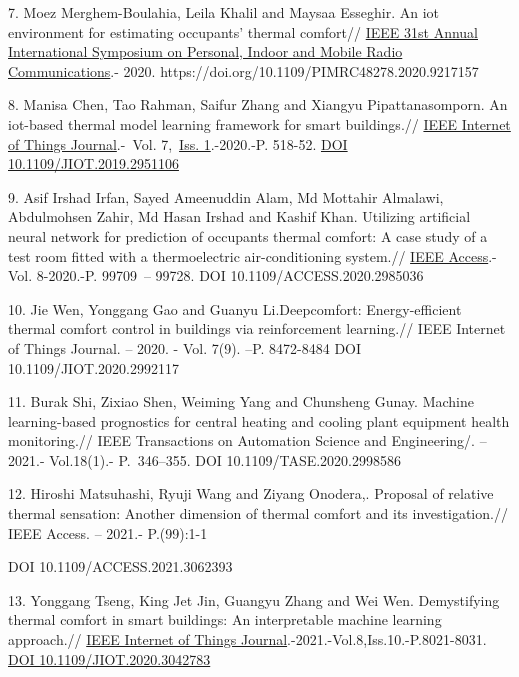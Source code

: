 \begin{references}
7. Moez Merghem-Boulahia, Leila Khalil and Maysaa Esseghir. An iot
environment for estimating occupants' thermal comfort//
\href{https://ieeexplore.ieee.org/xpl/conhome/9210501/proceeding}{IEEE
31st Annual International Symposium on Personal, Indoor and Mobile Radio
Communications}.- 2020. https://doi.org/10.1109/PIMRC48278.2020.9217157

8. Manisa Chen, Tao Rahman, Saifur Zhang and Xiangyu Pipattanasomporn.
An iot-based thermal model learning framework for smart buildings.//
\href{https://ieeexplore.ieee.org/xpl/RecentIssue.jsp?punumber=6488907}{IEEE
Internet of Things Journal}.-~Vol.
7,~\href{https://ieeexplore.ieee.org/xpl/tocresult.jsp?isnumber=8955685&punumber=6488907}{Iss.
1}.-2020.-P. 518-52.
\href{https://doi.org/10.1109/JIOT.2019.2951106}{DOI
10.1109/JIOT.2019.2951106}

9. Asif Irshad Irfan, Sayed Ameenuddin Alam, Md Mottahir Almalawi,
Abdulmohsen Zahir, Md Hasan Irshad and Kashif Khan. Utilizing artificial
neural network for prediction of occupants thermal comfort: A case study
of a test room fitted with a thermoelectric air-conditioning system.//
\href{https://ieeexplore.ieee.org/xpl/RecentIssue.jsp?punumber=6287639}{IEEE
Access}.-Vol. 8-2020.-P. 99709~-- 99728. DOI 10.1109/ACCESS.2020.2985036

10. Jie Wen, Yonggang Gao and Guanyu Li.Deepcomfort: Energy-efficient
thermal comfort control in buildings via reinforcement learning.// IEEE
Internet of Things Journal. -- 2020. - Vol. 7(9). --P. 8472-8484 DOI
10.1109/JIOT.2020.2992117

11. Burak Shi, Zixiao Shen, Weiming Yang and Chunsheng Gunay. Machine
learning-based prognostics for central heating and cooling plant
equipment health monitoring.// IEEE Transactions on Automation Science
and Engineering/. -- 2021.- Vol.18(1).- P.~346--355. DOI
10.1109/TASE.2020.2998586

12. Hiroshi Matsuhashi, Ryuji Wang and Ziyang Onodera,. Proposal of
relative thermal sensation: Another dimension of thermal comfort and its
investigation.// IEEE Access. -- 2021.- P.(99):1-1 

DOI 10.1109/ACCESS.2021.3062393

13. Yonggang Tseng, King Jet Jin, Guangyu Zhang and Wei Wen.
Demystifying thermal comfort in smart buildings: An interpretable
machine learning approach.//
\href{https://ieeexplore.ieee.org/xpl/RecentIssue.jsp?punumber=6488907}{IEEE
Internet of Things Journal}.-2021.-Vol.8,Iss.10.-P.8021-8031.
\href{https://doi.org/10.1109/JIOT.2020.3042783}{DOI
10.1109/JIOT.2020.3042783}


\end{references}
